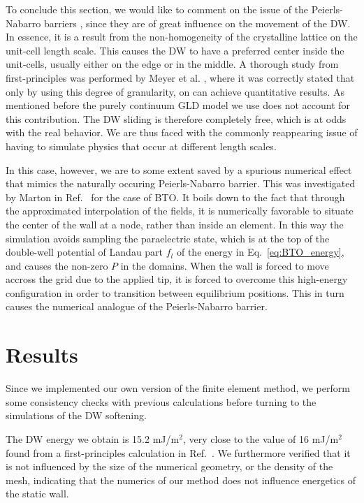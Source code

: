 To conclude this section, we would like to comment on the issue of the Peierls-Nabarro barriers \cite{Peierls1940,Nabarro1947}, since they are of great influence on the movement of the DW.
In essence, it is a result from the non-homogeneity of the crystalline lattice on the unit-cell length scale.
This causes the DW to have a preferred center inside the unit-cells, usually either on the edge or in the middle.
A thorough study from first-principles was performed by Meyer et al. \cite{Meyer2002}, where it was correctly stated that only by using this degree of granularity, on can achieve quantitative results.
As mentioned before the purely continuum GLD model we use does not account for this contribution.
The DW sliding is therefore completely free, which is at odds with the real behavior.
We are thus faced with the commonly reappearing issue of having to simulate physics that occur at different length scales.

In this case, however, we are to some extent saved by a spurious numerical effect that mimics the naturally occuring Peierls-Nabarro barrier.
This was investigated by Marton in Ref.~\cite{Marton2018} for the case of BTO.
It boils down to the fact that through the approximated interpolation of the fields, it is numerically favorable to situate the center of the wall at a node, rather than inside an element.
In this way the simulation avoids sampling the paraelectric state, which is at the top of the double-well potential of Landau part $f_l$ of the energy in Eq.~\eqref{eq:BTO_energy}, and causes the non-zero $P$ in the domains.
When the wall is forced to move accross the grid due to the applied tip, it is forced to overcome this high-energy configuration in order to transition between equilibrium positions.
This in turn causes the numerical analogue of the Peierls-Nabarro barrier.

\section{Results}
Since we implemented our own version of the finite element method, we perform some consistency checks with previous calculations before turning to the simulations of the DW softening.

The DW energy we obtain is 15.2 mJ/m$^2$, very close to the value of 16 mJ/m$^2$ found from a first-principles calculation in Ref.~\cite{Padilla1996}.
We furthermore verified that it is not influenced by the size of the numerical geometry, or the density of the mesh, indicating that the numerics of our method does not influence energetics of the static wall.

